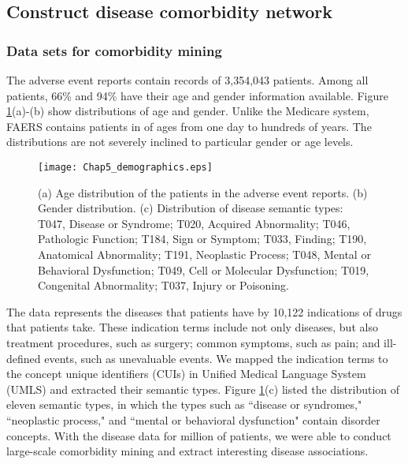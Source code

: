 \subsection{Construct disease comorbidity network}
\subsubsection{Data sets for comorbidity mining}
The adverse event reports contain records of 3,354,043 patients.
Among all patients, 66\% and 94\% have their age and gender information available.
Figure \ref{distr}(a)-(b) show distributions of age and gender.
Unlike the Medicare system, FAERS contains patients in of ages
from one day to hundreds of years.
The distributions are not severely inclined to particular gender or age levels.
\begin{figure}[!ht]
\vspace{-0.6cm}
\begin{center}
\texttt{[image: Chap5\_demographics.eps]}
\end{center}
\vspace{-0.5cm}
\caption{
{(a) Age distribution of the patients in the adverse event reports. (b) Gender distribution. (c) Distribution of disease semantic types: T047, Disease or Syndrome; T020, Acquired Abnormality; T046, Pathologic Function; T184, Sign or Symptom; T033, Finding; T190, Anatomical Abnormality; T191, Neoplastic Process; T048, Mental or Behavioral Dysfunction; T049, Cell or Molecular Dysfunction; T019, Congenital Abnormality; T037, Injury or Poisoning.}
}
\vspace{-0.5cm}
\label{distr}
\end{figure}

The data represents the diseases that patients have by 10,122 indications of drugs that patients take.
These indication terms include not only diseases, but also treatment procedures, such as surgery; common symptoms, such as pain; and ill-defined events, such as unevaluable events.
We mapped the indication terms to the concept unique identifiers (CUIs)
in Unified Medical Language System (UMLS) and extracted their semantic types.
Figure \ref{distr}(c) listed the distribution of eleven semantic types, in which
the types such as ``disease or syndromes," ``neoplastic process," and ``mental or behavioral dysfunction"
contain disorder concepts.
With the disease data for million of patients, we were able to conduct large-scale comorbidity mining and extract
interesting disease associations.

